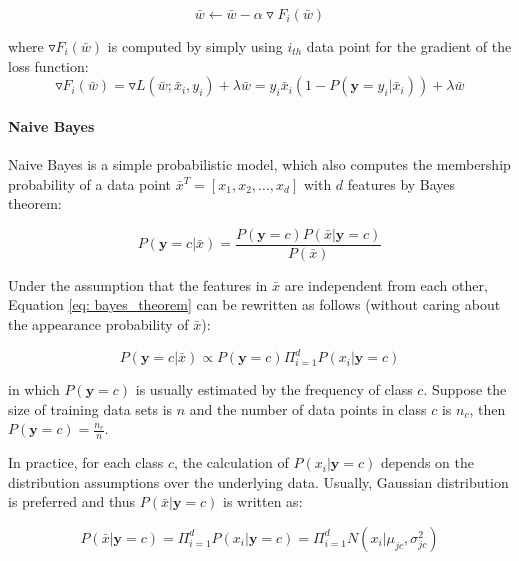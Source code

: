 \begin{equation}
    \bar{w} \leftarrow \bar{w} - \alpha \triangledown F_i(\bar{w})
\end{equation}

where $\triangledown F_i(\bar{w})$ is computed by simply using $i_{th}$ data point for the gradient of the loss function:
\begin{equation}
    \triangledown F_i(\bar{w}) = \triangledown L(\bar{w};\bar{x}_i,y_i) + \lambda \bar{w} = y_i\bar{x}_i(1-P(\textbf{y}=y_i|\bar{x}_i)) + \lambda \bar{w}
\end{equation}

\paragraph{Naive Bayes} Naive Bayes is a simple probabilistic model, which also computes the membership probability of a data point $\bar{x}^T = [x_1, x_2, \dots, x_d]$ with $d$ features by Bayes theorem:

\begin{equation}\label{eq: bayes_theorem}
P(\textbf{y}=c|\bar{x}) = \frac{P(\textbf{y}=c)P(\bar{x}|\textbf{y}=c)}{P(\bar{x})}    
\end{equation}

Under the assumption that the features in $\bar{x}$ are independent from each other, Equation \ref{eq: bayes_theorem} can be rewritten as follows (without caring about the appearance probability of $\bar{x}$):

\begin{equation}\label{eq: nb_exp}
    P(\textbf{y}=c|\bar{x}) \propto P(\textbf{y}=c)\Pi_{i=1}^dP(x_i|\textbf{y}=c)
\end{equation}

in which $P(\textbf{y}=c)$ is usually estimated by the frequency of class $c$. Suppose the size of training data sets is $n$ and the number of data points in class $c$ is $n_c$, then $P(\textbf{y}=c) = \frac{n_c}{n}$.

In practice, for each class $c$, the calculation of $P(x_i|\textbf{y}=c)$ depends on the distribution assumptions over the underlying data. Usually, Gaussian distribution is preferred and thus $P(\bar{x}|\textbf{y}=c)$ is written as:

\begin{equation}\label{eq: nb_guassian}
    P(\bar{x}|\textbf{y}=c) = \Pi_{i=1}^dP(x_i|\textbf{y}=c) = \Pi_{i=1}^dN(x_i|\mu_{jc}, \sigma_{jc}^2)
\end{equation}

